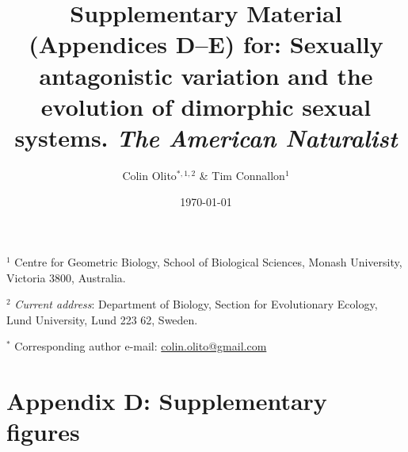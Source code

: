 \documentclass{article}
\title{Supplementary Material (Appendices D--E) for: Sexually antagonistic variation and the evolution of dimorphic sexual systems. \textit{The American Naturalist}}
\author{Colin Olito$^{\ast,1,2}$ \& Tim Connallon$^{1}$}
\date{\today}
\begin{document}
\maketitle


\noindent{} $^{1}$ Centre for Geometric Biology, School of Biological Sciences, Monash University, Victoria 3800, Australia.

\noindent{} $^{2}$ \textit{Current address}: Department of Biology, Section for Evolutionary Ecology, Lund University, Lund 223 62, Sweden.

\noindent{} $^{\ast}$ Corresponding author e-mail: \url{colin.olito@gmail.com}

\newpage
\pagestyle{fancyplain}
\makeatother
{}
\renewcommand{\headrulewidth}{0pt}
\renewcommand{\footrulewidth}{0pt}
\addtolength{\headheight}{0pt}


\section*{Appendix D: Supplementary figures}
\renewcommand{\theequation}{D\arabic{equation}}
\setcounter{equation}{0}
\renewcommand{\thefigure}{D\arabic{figure}}
\setcounter{figure}{0}
\end{document}
